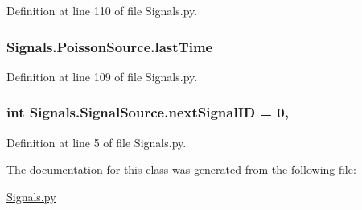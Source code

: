Definition at line 110 of file Signals.\+py.

\subsubsection[{\texorpdfstring{last\+Time}{lastTime}}]{\setlength{\rightskip}{0pt plus 5cm}Signals.\+Poisson\+Source.\+last\+Time\hspace{0.3cm}{\ttfamily [inherited]}}\hypertarget{classSignals_1_1PoissonSource_a66b0f3fb48cc130b6b07d7427092a522}{}\label{classSignals_1_1PoissonSource_a66b0f3fb48cc130b6b07d7427092a522}


Definition at line 109 of file Signals.\+py.

\subsubsection[{\texorpdfstring{next\+Signal\+ID}{nextSignalID}}]{\setlength{\rightskip}{0pt plus 5cm}int Signals.\+Signal\+Source.\+next\+Signal\+ID = 0\hspace{0.3cm}{\ttfamily [static]}, {\ttfamily [inherited]}}\hypertarget{classSignals_1_1SignalSource_abcff0d069f17cb5ebe3eff15b6283a64}{}\label{classSignals_1_1SignalSource_abcff0d069f17cb5ebe3eff15b6283a64}


Definition at line 5 of file Signals.\+py.



The documentation for this class was generated from the following file\+:\begin{DoxyCompactItemize}
\item 
\hyperlink{Signals_8py}{Signals.\+py}\end{DoxyCompactItemize}
